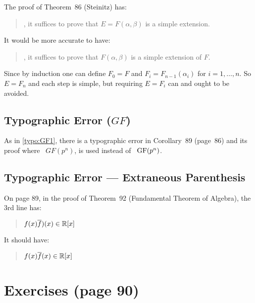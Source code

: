 The proof of Theorem~86 (Steinitz) has:
\begin{quotation}
\mldots, it suffices to prove that \(E = F(\alpha, \beta)\)
is a simple extension.
\end{quotation}
It would be more accurate to have:
\begin{quotation}
\mldots, it suffices to prove that \(F(\alpha, \beta)\)
is a simple extension of $F$.
\end{quotation}
Since by induction one can define \(F_0 = F\) and \(F_i = F_{n-1}(\alpha_i)\)
for \(i=1,\ldots,n\). So \(E=F_n\) and each step is simple,
but requiring \(E = F_i\) can and ought to be avoided.

\subsection{Typographic Error (\ensuremath{GF})}  \label{typo:GF2}

As in \ref{typo:GF1}, there is a typographic error
in Corollary~89 (page~86) and its proof where \, \(GF(p^n)\), is used instead
of \, \(\mathop{\rm GF}\nolimits(p^n)\).


\subsection{Typographic Error --- Extraneous Parenthesis}

On page 89, in the proof of Theorem~92 (Fundamental Theorem of Algebra),
the 3rd line has:
\begin{quotation}
\(f(x)\overline{f})(x) \in \mathbb{R}[x]\)
\end{quotation}
It should have:
\begin{quotation}
\(f(x)\overline{f}(x) \in \mathbb{R}[x]\)
\end{quotation}


\section{Exercises (page 90)}


